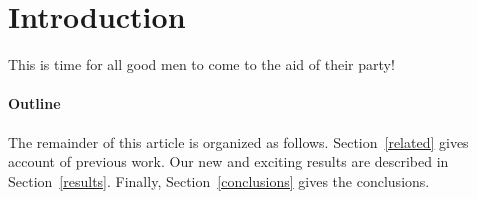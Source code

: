 \section{Introduction}\label{intro}
This is time for all good men to come to the aid of their party!

\paragraph{Outline}
The remainder of this article is organized as follows.
Section~\ref{related} gives account of previous work.
Our new and exciting results are described in Section~\ref{results}.
Finally, Section~\ref{conclusions} gives the conclusions.
